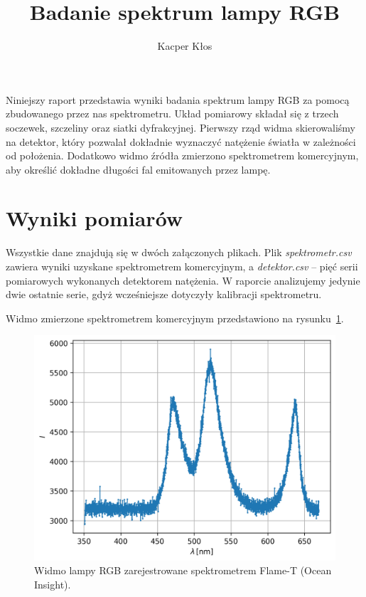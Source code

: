 \documentclass[12pt]{article}
\title{Badanie spektrum lampy RGB}
\author{Kacper Kłos}
\begin{document}
\maketitle

Niniejszy raport przedstawia wyniki badania spektrum lampy RGB za pomocą zbudowanego przez nas spektrometru.  
Układ pomiarowy składał się z trzech soczewek, szczeliny oraz siatki dyfrakcyjnej.  
Pierwszy rząd widma skierowaliśmy na detektor, który pozwalał dokładnie wyznaczyć natężenie światła w zależności od położenia.  
Dodatkowo widmo źródła zmierzono spektrometrem komercyjnym, aby określić dokładne długości fal emitowanych przez lampę.

\vspace{1 in}

\section{Wyniki pomiarów}

Wszystkie dane znajdują się w dwóch załączonych plikach.  
Plik \textit{spektrometr.csv} zawiera wyniki uzyskane spektrometrem komercyjnym, a \textit{detektor.csv} – pięć serii pomiarowych wykonanych detektorem natężenia.  
W raporcie analizujemy jedynie dwie ostatnie serie, gdyż wcześniejsze dotyczyły kalibracji spektrometru.

Widmo zmierzone spektrometrem komercyjnym przedstawiono na rysunku~\ref{fig:spektrometr}.

\begin{figure}[H]
  \centering
  \includegraphics[scale=0.7]{spektrum}
  \caption{Widmo lampy RGB zarejestrowane spektrometrem Flame-T (Ocean Insight).}
  \label{fig:spektrometr}
\end{figure}
\end{document}
